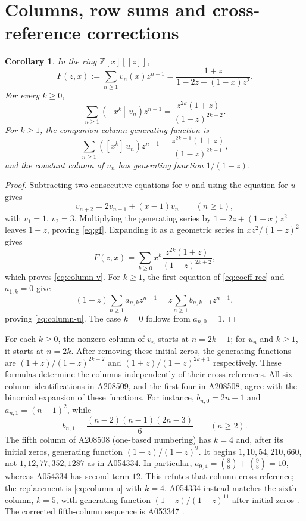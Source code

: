\documentclass[11pt]{article}
\newtheorem{corollary}[theorem]{Corollary}
\newcommand{\coeff}[2]{[x^{#1}]\,#2}
\begin{document}
\section{Columns, row sums and cross-reference corrections}
\begin{corollary}\label{cor:generating}
In the ring $\mathbb Z[x][[z]]$,
\begin{equation}\label{eq:gf}
F(z,x):=\sum_{n\geq1}v_n(x)z^{n-1}
=\frac{1+z}{1-2z+(1-x)z^2}.
\end{equation}
For every $k\geq0$,
\begin{equation}\label{eq:column-v}
\sum_{n\geq1}(\coeff{k}{v_n})z^{n-1}
=\frac{z^{2k}(1+z)}{(1-z)^{2k+2}}.
\end{equation}
For $k\geq1$, the companion column generating function is
\begin{equation}\label{eq:column-u}
\sum_{n\geq1}(\coeff{k}{u_n})z^{n-1}
=\frac{z^{2k-1}(1+z)}{(1-z)^{2k+1}},
\end{equation}
and the constant column of $u_n$ has generating function $1/(1-z)$.
\end{corollary}
\begin{proof}
Subtracting two consecutive equations for $v$ and using the equation for
$u$ gives
\[
v_{n+2}=2v_{n+1}+(x-1)v_n\qquad(n\geq1),
\]
with $v_1=1$, $v_2=3$. Multiplying the generating series by
$1-2z+(1-x)z^2$ leaves $1+z$, proving \eqref{eq:gf}.
Expanding it as a geometric series in $xz^2/(1-z)^2$ gives
\[
F(z,x)=\sum_{k\geq0}x^k\frac{z^{2k}(1+z)}{(1-z)^{2k+2}},
\]
which proves \eqref{eq:column-v}. For $k\geq1$, the first equation of
\eqref{eq:coeff-rec} and $a_{1,k}=0$ give
\[
(1-z)\sum_{n\geq1}a_{n,k}z^{n-1}
=z\sum_{n\geq1}b_{n,k-1}z^{n-1},
\]
proving \eqref{eq:column-u}.
The case $k=0$ follows from $a_{n,0}=1$.
\end{proof}

For each $k\geq0$, the nonzero column of $v_n$ starts at $n=2k+1$;
for $u_n$ and $k\geq1$, it starts at $n=2k$.
After removing these initial zeros, the generating functions are
$(1+z)/(1-z)^{2k+2}$ and $(1+z)/(1-z)^{2k+1}$ respectively.
These formulas determine the columns independently of their cross-references.
All six column identifications in A208509, and the first four in A208508,
agree with the binomial expansion of these functions. For instance,
$b_{n,0}=2n-1$ and $a_{n,1}=(n-1)^2$, while
\[
b_{n,1}=\frac{(n-2)(n-1)(2n-3)}6\qquad(n\geq2).
\]
The fifth column of A208508 (one-based numbering) has $k=4$ and,
after its initial zeros, generating function $(1+z)/(1-z)^9$.
It begins $1,10,54,210,660$, not $1,12,77,352,1287$ as in A054334.
In particular, $a_{9,4}=\binom88+\binom98=10$, whereas A054334
has second term $12$. This refutes that column cross-reference; the
replacement is \eqref{eq:column-u} with $k=4$. A054334 instead matches
the sixth column, $k=5$, with generating function $(1+z)/(1-z)^{11}$
after initial zeros \cite{a054334}. The corrected fifth-column sequence
is A053347 \cite{columns}.
\end{document}
